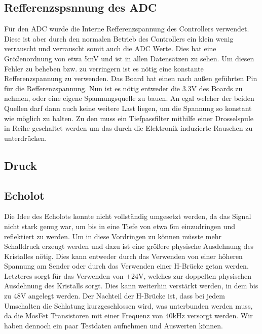 \documentclass[12pt,a4paper,titlepage,headinclude,bibtotoc]{scrartcl}
\begin{document}
\subsection{Refferenzspsnnung des ADC}
Für den ADC wurde die Interne Refferenzspannung des Controllers verwendet.
Diese ist aber durch den normalen Betrieb des Controllers ein klein wenig verrauscht und verrauscht somit auch die ADC Werte.
Dies hat eine Größenordnung von etwa 5\si{\milli\volt} und ist in allen Datensätzen zu sehen.
Um diesen Fehler zu beheben bzw. zu verringern ist es nötig eine konstante Refferenzspannung zu verwenden.
Das Board hat einen nach außen geführten Pin für die Refferenzspannung.
Nun ist es nötig entweder die 3.3\si{\volt} des Boards zu nehmen, oder eine eigene Spannungsquelle zu bauen.
An egal welcher der beiden Quellen darf dann auch keine weitere Last liegen, um die Spannung so konstant wie möglich zu halten.
Zu den muss ein Tiefpassfilter mithilfe einer Drosselspule in Reihe geschaltet werden um das durch die Elektronik induzierte Rauschen zu unterdrücken.

\subsection{Druck}


\subsection{Echolot}
Die Idee des Echolots konnte nicht vollständig umgesetzt werden, da das Signal nicht stark genug war, um bis in eine Tiefe von etwa 6\si{\meter} einzudringen und reflektiert zu werden.
Um in diese Vordringen zu können müsste mehr Schalldruck erzeugt werden und dazu ist eine größere physische Ausdehnung des Kristalles nötig.
Dies kann entweder durch das Verwenden von einer höheren Spannung am Sender oder durch das Verwenden einer H-Brücke getan werden.
Letzteres sorgt für das Verwenden von $\pm24\si{\volt}$, welches zur doppelten physischen Ausdehnung des Kristalls sorgt.
Dies kann weiterhin verstärkt werden, in dem bis zu 48\si{\volt} angelegt werden.
Der Nachteil der H-Brücke ist, dass bei jedem Umschalten die Schlatung kurzgeschlossen wird, was unterbunden werden muss, da die MosFet Transistoren mit einer Frequenz von 40\si{\kilo\hertz} versorgt werden.
Wir haben dennoch ein paar Testdaten aufnehmen und Auswerten können.
\end{document}
